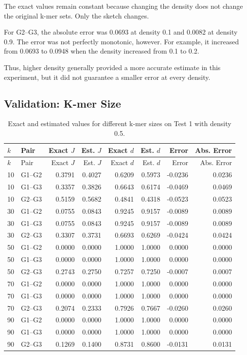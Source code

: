 \documentclass[11pt,a4paper]{article}
\begin{document}
The exact values remain constant because changing the density does not change
the original k-mer sets. Only the sketch changes.

For G2--G3, the absolute error was 0.0693 at density 0.1 and 0.0082 at
density 0.9. The error was not perfectly monotonic, however. For example, it
increased from 0.0693 to 0.0948 when the density increased from 0.1 to 0.2.

Thus, higher density generally provided a more accurate estimate in this
experiment, but it did not guarantee a smaller error at every density.


\subsection{Validation: K-mer Size}

\begin{longtable}{llrrrrrr}
\caption{Exact and estimated values for different k-mer sizes on Test 1
with density 0.5.}
\\
\toprule
$k$ & Pair & Exact $J$ & Est. $J$ &
Exact $d$ & Est. $d$ & Error & Abs. Error\\
\midrule
\endfirsthead

\toprule
$k$ & Pair & Exact $J$ & Est. $J$ &
Exact $d$ & Est. $d$ & Error & Abs. Error\\
\midrule
\endhead

10&G1--G2&0.3791&0.4027&0.6209&0.5973&-0.0236&0.0236\\
10&G1--G3&0.3357&0.3826&0.6643&0.6174&-0.0469&0.0469\\
10&G2--G3&0.5159&0.5682&0.4841&0.4318&-0.0523&0.0523\\

30&G1--G2&0.0755&0.0843&0.9245&0.9157&-0.0089&0.0089\\
30&G1--G3&0.0755&0.0843&0.9245&0.9157&-0.0089&0.0089\\
30&G2--G3&0.3307&0.3731&0.6693&0.6269&-0.0424&0.0424\\

50&G1--G2&0.0000&0.0000&1.0000&1.0000&0.0000&0.0000\\
50&G1--G3&0.0000&0.0000&1.0000&1.0000&0.0000&0.0000\\
50&G2--G3&0.2743&0.2750&0.7257&0.7250&-0.0007&0.0007\\

70&G1--G2&0.0000&0.0000&1.0000&1.0000&0.0000&0.0000\\
70&G1--G3&0.0000&0.0000&1.0000&1.0000&0.0000&0.0000\\
70&G2--G3&0.2074&0.2333&0.7926&0.7667&-0.0260&0.0260\\

90&G1--G2&0.0000&0.0000&1.0000&1.0000&0.0000&0.0000\\
90&G1--G3&0.0000&0.0000&1.0000&1.0000&0.0000&0.0000\\
90&G2--G3&0.1269&0.1400&0.8731&0.8600&-0.0131&0.0131\\

\bottomrule
\end{longtable}
\end{document}

